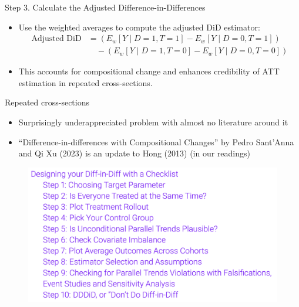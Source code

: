 \documentclass{beamer}
\begin{document}
\begin{frame}{Step 3. Calculate the Adjusted Difference-in-Differences}
\begin{itemize}
  \item Use the weighted averages to compute the adjusted DiD estimator:
  \begin{align*}
    \text{Adjusted DiD} &= \left( E_w[Y \mid D = 1, T = 1] - E_w[Y \mid D = 0, T = 1] \right) \\
    &\quad - \left( E_w[Y \mid D = 1, T = 0] - E_w[Y \mid D = 0, T = 0] \right)
  \end{align*}
  \item This accounts for compositional change and enhances credibility of ATT estimation in repeated cross-sections.
\end{itemize}
\end{frame}


\begin{frame}{Repeated cross-sections}

\begin{itemize}
\item Surprisingly underappreciated problem with almost no literature around it
\item ``Difference-in-differences with Compositional Changes'' by Pedro Sant'Anna and Qi Xu (2023) is an update to Hong (2013) (in our readings)
\end{itemize}

\end{frame}






\begin{frame}
 
\begin{figure}
    \centering
    \includegraphics[width=\textwidth]{./lecture_includes/checklist}
\end{figure}

\end{frame}
\end{document}
